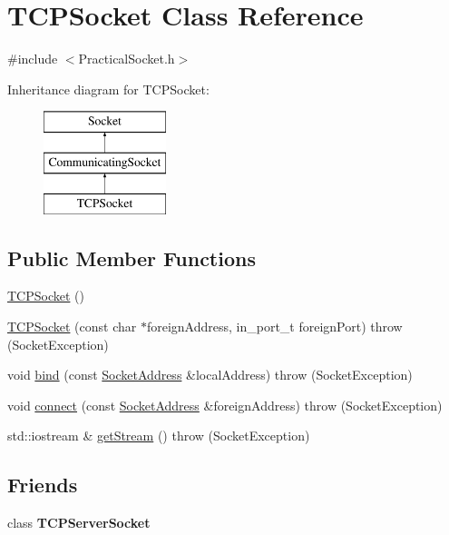 \hypertarget{class_t_c_p_socket}{}\section{T\+C\+P\+Socket Class Reference}
\label{class_t_c_p_socket}


{\ttfamily \#include $<$Practical\+Socket.\+h$>$}

Inheritance diagram for T\+C\+P\+Socket\+:\begin{figure}[H]
\begin{center}
\leavevmode
\includegraphics[height=3.000000cm]{class_t_c_p_socket}
\end{center}
\end{figure}
\subsection*{Public Member Functions}
\begin{DoxyCompactItemize}
\item 
\hyperlink{class_t_c_p_socket_a7a50427a401d1a6f3209d51818bad901}{T\+C\+P\+Socket} ()
\item 
\hyperlink{class_t_c_p_socket_a8acb7c1cfa441458cc08da69faf253f3}{T\+C\+P\+Socket} (const char $\ast$foreign\+Address, in\+\_\+port\+\_\+t foreign\+Port)  throw (\+Socket\+Exception)
\item 
void \hyperlink{class_t_c_p_socket_a03a38720ee30fb021ffd9d2a6429a66a}{bind} (const \hyperlink{class_socket_address}{Socket\+Address} \&local\+Address)  throw (\+Socket\+Exception)
\item 
void \hyperlink{class_t_c_p_socket_a943f94b4cf9b983e7abb21f867a72697}{connect} (const \hyperlink{class_socket_address}{Socket\+Address} \&foreign\+Address)  throw (\+Socket\+Exception)
\item 
std\+::iostream \& \hyperlink{class_t_c_p_socket_a441d8a3b2e043186b70cfea27f3e5780}{get\+Stream} ()  throw (\+Socket\+Exception)
\end{DoxyCompactItemize}
\subsection*{Friends}
\begin{DoxyCompactItemize}
\item 
class {\bfseries T\+C\+P\+Server\+Socket}\hypertarget{class_t_c_p_socket_ae8bcdc0d25881a17b23e557296236fa9}{}\label{class_t_c_p_socket_ae8bcdc0d25881a17b23e557296236fa9}

\end{DoxyCompactItemize}
